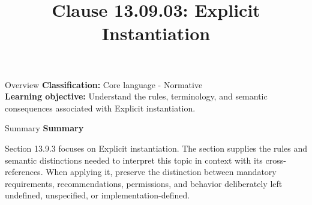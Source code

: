 \documentclass[10pt,letterpaper]{article}
\title{Clause 13.09.03: Explicit Instantiation}
\author{}
\date{}
\begin{document}
\maketitle
\begin{CornellOverviewBox}{Overview}
\textbf{Classification:} Core language - Normative\\[2pt]
\textbf{Learning objective:} Understand the rules, terminology, and semantic consequences associated with Explicit instantiation.
\end{CornellOverviewBox}\begin{CornellSummaryBox}{Summary}
{\sffamily\bfseries\color{Accent} Summary}\par\vspace{3pt}Section 13.9.3 focuses on Explicit instantiation. The section supplies the rules and semantic distinctions needed to interpret this topic in context with its cross-references. When applying it, preserve the distinction between mandatory requirements, recommendations, permissions, and behavior deliberately left undefined, unspecified, or implementation-defined.
\end{CornellSummaryBox}
\end{document}
